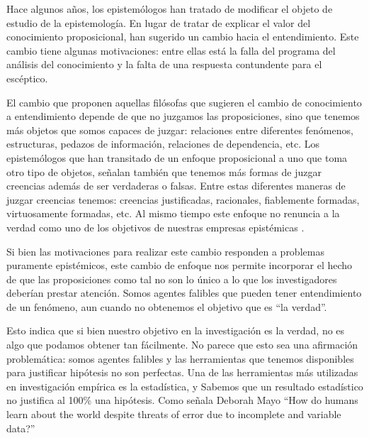 \documentclass{article}
\begin{document}
Hace algunos años, los epistemólogos han tratado de modificar el objeto de estudio de la epistemología. En lugar de tratar de explicar el valor del conocimiento proposicional, han sugerido un cambio hacia el entendimiento. Este cambio tiene algunas motivaciones: entre ellas está la falla del programa del análisis del conocimiento y la falta de una respuesta contundente para el escéptico. 

El cambio que proponen aquellas filósofas que sugieren el cambio de conocimiento a entendimiento depende de que no juzgamos las proposiciones, sino que tenemos más objetos que somos capaces de juzgar: relaciones entre diferentes fenómenos, estructuras, pedazos de información, relaciones de dependencia, etc. Los epistemólogos que han transitado de un enfoque proposicional a uno que toma otro tipo de objetos, señalan también que tenemos más formas de juzgar creencias además de ser verdaderas o falsas. Entre estas diferentes maneras de juzgar creencias tenemos: creencias justificadas, racionales, fiablemente formadas, virtuosamente formadas, etc. Al mismo tiempo este enfoque no renuncia a la verdad como uno de los objetivos de nuestras empresas epistémicas \cite{Grimm2012-GRITVO-4}.

Si bien las motivaciones para realizar este cambio responden a problemas puramente epistémicos, este cambio de enfoque nos permite incorporar el hecho de que las proposiciones como tal no son lo único a lo que los investigadores deberían prestar atención. Somos agentes falibles que pueden tener entendimiento de un fenómeno, aun cuando no obtenemos el objetivo que es ``la verdad''.

Esto indica que si bien nuestro objetivo en la investigación es la verdad, no es algo que podamos obtener tan fácilmente. No parece que esto sea una afirmación problemática: somos agentes falibles y las herramientas que tenemos disponibles para justificar hipótesis no son perfectas. Una de las herramientas más utilizadas en investigación empírica es la estadística, y Sabemos que un resultado estadístico no justifica al 100\% una hipótesis. Como señala Deborah Mayo ``How do humans learn about the world despite threats of error due to incomplete and variable data?'' \cite[p.~ xi]{Mayo2018} 
\end{document}
